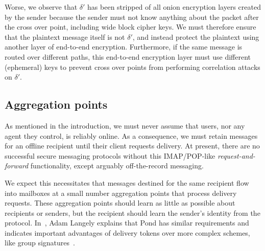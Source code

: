 \documentclass[twoside,letterpaper]{llncs}
\begin{document}
Worse, we observe that $\delta'$ has been stripped of all onion
encryption layers created by the sender because the sender must not
know anything about the packet after the cross over point,
 including wide block cipher keys.
We must therefore ensure that the plaintext message itself
 is not $\delta'$, and instead protect the plaintext using
 another layer of end-to-end encryption.
 Furthermore, if the same message is routed over different
 paths, this end-to-end encryption layer must use different
 (ephemeral) keys to prevent cross over points from performing
 correlation attacks on $\delta'$.


\subsection{Aggregation points}

As mentioned in the introduction, we must never assume that users,
nor any agent they control, is reliably online.  
As a consequence, we must retain messages for an offline recipient
until their client requests delivery.  
At present, there are no successful secure messaging protocols without
this IMAP/POP-like {\em request-and-forward} functionality, except
arguably off-the-record messaging. 

We expect this necessitates that messages destined for the same
recipient flow into mailboxes at a small number aggregation points
that process delivery requests.  These aggregation points should
learn as little as possible about recipients or senders, but the
recipient should learn the sender's identity from the protocol.
In~\cite{agl-pond-hmac}, Adam Langely explains that Pond has similar
requirements and indicates important advantages of delivery tokens
over more complex schemes, like group signatures~\cite{VLR,BBS}.
\end{document}
